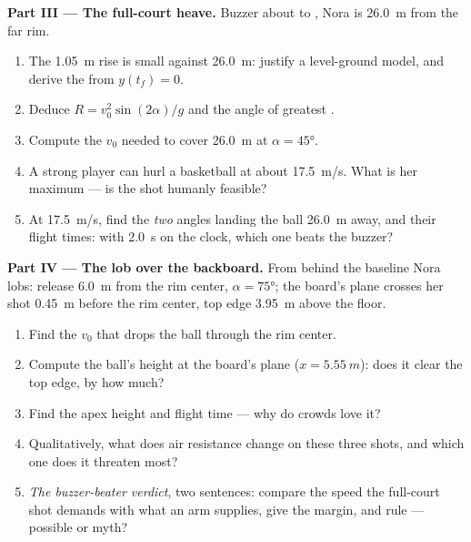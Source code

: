 \begin{problem}
\medskip\noindent\textbf{Part III --- The full-court heave.} Buzzer about
to , Nora is \qty{26.0}{m} from the far rim.
\begin{enumerate}[resume]
  \item The \qty{1.05}{m} rise is small against \qty{26.0}{m}: justify a
        level-ground model, and derive the  from $y(t_f) = 0$.
  \item Deduce $R = v_0^2\sin(2\alpha)/g$ and the angle of greatest .
  \item Compute the $v_0$ needed to cover \qty{26.0}{m} at $\alpha = \ang{45}$.
  \item A strong player can hurl a basketball at about \qty{17.5}{m/s}.
        What is her maximum  --- is the shot humanly feasible?
  \item At \qty{17.5}{m/s}, find the \emph{two} angles landing the ball
        \qty{26.0}{m} away, and their flight times: with \qty{2.0}{s} on
        the clock, which one beats the buzzer?
\end{enumerate}

\medskip\noindent\textbf{Part IV --- The lob over the backboard.} From
behind the baseline Nora lobs: release \qty{6.0}{m} from the rim center,
$\alpha = \ang{75}$; the board's plane crosses her shot \qty{0.45}{m}
before the rim center, top edge \qty{3.95}{m} above the floor.
\begin{enumerate}[resume]
  \item Find the $v_0$ that drops the ball through the rim center.
  \item Compute the ball's height at the board's plane
        ($x = \qty{5.55}{m}$): does it clear the top edge, by how much?
  \item Find the apex height and flight time --- why do crowds love it?
  \item Qualitatively, what does air resistance change on these three
        shots, and which one does it threaten most?
  \item \emph{The buzzer-beater verdict}, two sentences: compare the speed
        the full-court shot demands with what an arm supplies, give the
        margin, and rule --- possible or myth?
\end{enumerate}
\end{problem}
